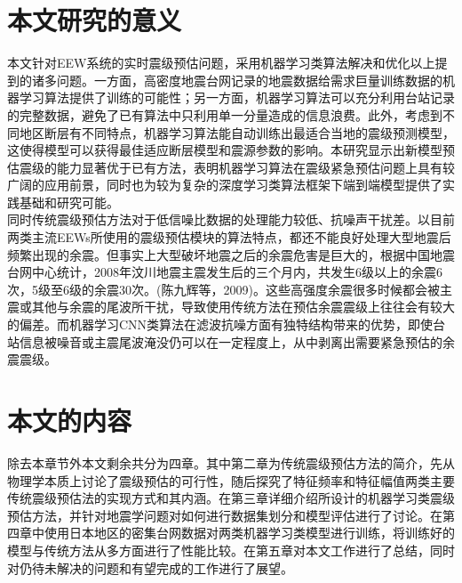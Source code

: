 \section{本文研究的意义}
\indent 本文针对EEW系统的实时震级预估问题，采用机器学习类算法解决和优化以上提到的诸多问题。一方面，高密度地震台网记录的地震数据给需求巨量训练数据的机器学习算法提供了训练的可能性；另一方面，机器学习算法可以充分利用台站记录的完整数据，避免了已有算法中只利用单一分量造成的信息浪费。此外，考虑到不同地区断层有不同特点，机器学习算法能自动训练出最适合当地的震级预测模型，这使得模型可以获得最佳适应断层模型和震源参数的影响。本研究显示出新模型预估震级的能力显著优于已有方法，表明机器学习算法在震级紧急预估问题上具有较广阔的应用前景，同时也为较为复杂的深度学习类算法框架下端到端模型提供了实践基础和研究可能。\\
\indent 同时传统震级预估方法对于低信噪比数据的处理能力较低、抗噪声干扰差。以目前两类主流EEWs所使用的震级预估模块的算法特点，都还不能良好处理大型地震后频繁出现的余震。但事实上大型破坏地震之后的余震危害是巨大的，根据中国地震台网中心统计，2008年汶川地震主震发生后的三个月内，共发生6级以上的余震6次，5级至6级的余震30次。(陈九辉等，2009)。这些高强度余震很多时候都会被主震或其他与余震的尾波所干扰，导致使用传统方法在预估余震震级上往往会有较大的偏差。而机器学习CNN类算法在滤波抗噪方面有独特结构带来的优势，即使台站信息被噪音或主震尾波淹没仍可以在一定程度上，从中剥离出需要紧急预估的余震震级。\\
\section{本文的内容}
\indent 除去本章节外本文剩余共分为四章。其中第二章为传统震级预估方法的简介，先从物理学本质上讨论了震级预估的可行性，随后探究了特征频率和特征幅值两类主要传统震级预估法的实现方式和其内涵。在第三章详细介绍所设计的机器学习类震级预估方法，并针对地震学问题对如何进行数据集划分和模型评估进行了讨论。在第四章中使用日本地区的密集台网数据对两类机器学习类模型进行训练，将训练好的模型与传统方法从多方面进行了性能比较。在第五章对本文工作进行了总结，同时对仍待未解决的问题和有望完成的工作进行了展望。\\